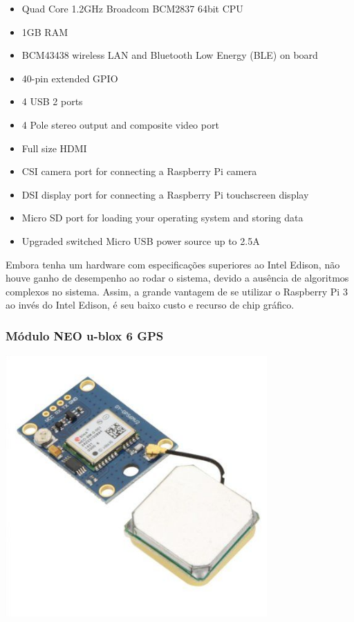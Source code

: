 \documentclass[a4paper, 12pt]{article}
\begin{document}
\begin{itemize}
\item Quad Core 1.2GHz Broadcom BCM2837 64bit CPU
\item 1GB RAM
\item BCM43438 wireless LAN and Bluetooth Low Energy (BLE) on board
\item 40-pin extended GPIO
\item 4 USB 2 ports
\item 4 Pole stereo output and composite video port
\item Full size HDMI
\item CSI camera port for connecting a Raspberry Pi camera
\item DSI display port for connecting a Raspberry Pi touchscreen display
\item Micro SD port for loading your operating system and storing data
\item Upgraded switched Micro USB power source up to 2.5A
\end{itemize}

Embora tenha um hardware com especificações superiores ao Intel Edison, não houve ganho de desempenho ao rodar o sistema, devido a ausência de algoritmos complexos no sistema. Assim, a grande vantagem de se utilizar o Raspberry Pi 3 ao invés do Intel Edison, é seu baixo custo e recurso de chip gráfico.

\subsubsection{Módulo NEO u-blox 6 GPS}

\includegraphics[width=10cm, center]{images/neo-6m}
\end{document}
